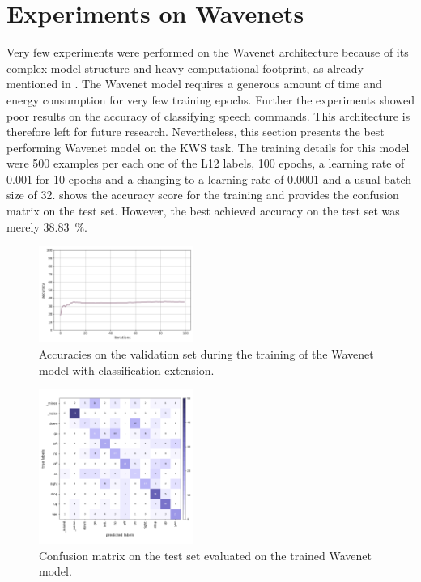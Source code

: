 
\section{Experiments on Wavenets}\label{exp_wavenet}
Very few experiments were performed on the Wavenet architecture because of its complex model structure and heavy computational footprint, as already mentioned in .
The Wavenet model requires a generous amount of time and energy consumption for very few training epochs.
Further the experiments showed poor results on the accuracy of classifying speech commands.
This architecture is therefore left for future research.
Nevertheless, this section presents the best performing Wavenet model on the KWS task.
The training details for this model were 500 examples per each one of the L12 labels, 100 epochs, a learning rate of $0.001$ for 10 epochs and a changing to a learning rate of $0.0001$ and a usual batch size of 32.
 shows the accuracy score for the training and  provides the confusion matrix on the test set.
However, the best achieved accuracy on the test set was merely \SI{38.83}{\percent}.
\begin{figure}[!ht]
  \centering
  \includegraphics[width=0.45\textwidth]{./5_exp/figs/exp_wavenet_acc.png}
  \caption{Accuracies on the validation set during the training of the Wavenet model with classification extension.}
  \label{fig:exp_wavenet_acc}
\end{figure}
\begin{figure}[!ht]
  \centering
  \includegraphics[width=0.45\textwidth]{./5_exp/figs/exp_wavenet_confusion_test.png}
  \caption{Confusion matrix on the test set evaluated on the trained Wavenet model.}
  \label{fig:exp_wavenet_confusion}
\end{figure}
\FloatBarrier
\noindent